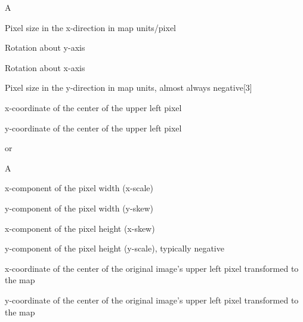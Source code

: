 \begin{labeling}[:]{A}
    \item[A]Pixel size in the x-direction in map units/pixel
    \item[D]Rotation about y-axis
    \item[B]Rotation about x-axis
    \item[E]Pixel size in the y-direction in map units, almost always negative[3]
    \item[C]x-coordinate of the center of the upper left pixel
    \item[F]y-coordinate of the center of the upper left pixel
\end{labeling}


or

\begin{labeling}[:]{A}
    \item[A]x-component of the pixel width (x-scale)
    \item[D]y-component of the pixel width (y-skew)
    \item[B]x-component of the pixel height (x-skew)
    \item[E]y-component of the pixel height (y-scale), typically negative
    \item[C]x-coordinate of the center of the original image's upper left pixel transformed to the map
    \item[F]y-coordinate of the center of the original image's upper left pixel transformed to the map
\end{labeling}

